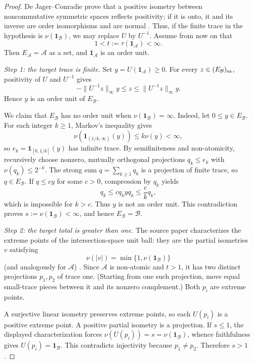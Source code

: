 \documentclass[11pt]{article}
\newcommand{\A}{\mathcal A}
\newcommand{\B}{\mathcal B}
\newcommand{\one}{\mathbf 1}
\begin{document}
\begin{proof}
De Jager--Conradie prove that a positive isometry between noncommutative
symmetric spaces reflects positivity; if it is onto, it and its inverse are
order isomorphisms and are normal
\cite[Lemma~3.1]{deJagerConradieSymmetric}.  Thus, if the finite trace in the
hypothesis is $\nu(\one_\B)$, we may replace $U$ by $U^{-1}$.  Assume from now
on that
\[
 1< t:=\tau(\one_\A)<\infty.
\]
Then $E_\A=\A$ as a set, and $\one_\A$ is an order unit.

\medskip
\noindent\emph{Step 1: the target trace is finite.}
Set $y=U(\one_\A)\geq0$.  For every $z\in(E_\B)_{\rm sa}$, positivity of
$U$ and $U^{-1}$ gives
\[
 -\|U^{-1}z\|_\infty y\leq z\leq
 \|U^{-1}z\|_\infty y.
\]
Hence $y$ is an order unit of $E_\B$.

We claim that $E_\B$ has no order unit when $\nu(\one_\B)=\infty$.  Indeed,
let $0\leq y\in E_\B$.  For each integer $k\geq1$, Markov's inequality gives
\[
 \nu\!\left(\mathbf1_{(1/k,\infty)}(y)\right)\leq k\nu(y)<\infty,
\]
so $e_k=\mathbf1_{[0,1/k]}(y)$ has infinite trace.  By semifiniteness and
non-atomicity, recursively choose nonzero, mutually orthogonal projections
$q_k\leq e_k$ with $\nu(q_k)\leq2^{-k}$.  The strong sum
$q=\sum_{k\geq1}q_k$ is a projection of finite trace, so $q\in E_\B$.
If $q\leq cy$ for some $c>0$, compression by $q_k$ yields
\[
 q_k\leq c q_k yq_k\leq \frac{c}{k}q_k,
\]
which is impossible for $k>c$.  Thus $y$ is not an order unit.  This
contradiction proves $s:=\nu(\one_\B)<\infty$, and hence $E_\B=\B$.

\medskip
\noindent\emph{Step 2: the target total is greater than one.}
The source paper characterizes the extreme points of the intersection-space
unit ball: they are the partial isometries $v$ satisfying
\[
 \nu(|v|)=\min\{1,\nu(\one_\B)\}
\]
(and analogously for $\A$)
\cite[Proposition~5.1]{deJagerConradieExtreme}.  Since $\A$ is non-atomic and
$t>1$, it has two distinct projections $p_1,p_2$ of trace one.  (Starting from
one such projection, move equal small-trace pieces between it and its nonzero
complement.)  Both $p_i$ are extreme points.

A surjective linear isometry preserves extreme points, so each $U(p_i)$ is a
positive extreme point.  A positive partial isometry is a projection.  If
$s\leq1$, the displayed characterization forces
\(\nu(U(p_i))=s=\nu(\one_\B)\), whence faithfulness gives
$U(p_i)=\one_\B$.  This contradicts injectivity because $p_1\ne p_2$.
Therefore $s>1$.


\end{proof}
\end{document}
